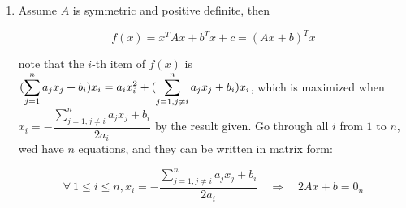 \documentclass[
]{article}
\begin{document}
\begin{enumerate}
\[  \begin{bmatrix}

  5&3&1\\3&3&1\\1&1&1

  \end{bmatrix}

  \begin{bmatrix}

  12\\10\\0

  \end{bmatrix}=\begin{bmatrix}

  \dfrac{45}{2}\\\dfrac{33}{2}\\\dfrac{11}{2}

  \end{bmatrix}\]

  which is the unique critical point. Then we check the 2nd order
  condition, since \(A\) is symmetric, and

  \[|A-\lambda I_3|=\begin{vmatrix}-1-\lambda&1&0\\1&-2-\lambda&1\\0&1&-3-\lambda\end{vmatrix}=-(\lambda+2)(\lambda^2+4\lambda+1)=0\]

  \(A\)\textquotesingle s eigenvalues are
  \(\lambda_1=-2<0,\lambda_2=-2-\sqrt{3}<0,\lambda_3=-2+\sqrt{3}<0\), we
  know that \(A\) is negative definite. Therefore, \(x^*\) is a global
  maximum point of \(f\),

  \[\max_xf(x)=f(x^*)=f(\dfrac{45}{2},\dfrac{33}{2},\dfrac{11}{2})=\dfrac{635}{2}\]
\item
  Assume \(A\) is symmetric and positive definite, then

  \[f(x)=x^TAx+b^Tx+c=(Ax+b)^Tx\]

  note that the \(i\)-th item of \(f(x)\) is
  \(\displaystyle(\sum_{j=1}^na_jx_j+b_i)x_i=a_ix_i^2+(\sum_{j=1,\\j\neq i}^na_jx_j+b_i)x_i\),
  which is maximized when
  \(x_i=-\dfrac{\displaystyle \sum_{j=1,j\neq i}^na_jx_j+b_i}{2a_i}\) by
  the result given. Go through all \(i\) from \(1\) to \(n\),
  we\textquotesingle d have \(n\) equations, and they can be written in
  matrix form:

  \[\forall\ 1\leqslant i\leqslant n,x_i=-\dfrac{\displaystyle \sum_{j=1,j\neq i}^na_jx_j+b_i}{2a_i}\quad\Rightarrow\quad 2Ax+b=0_n\]


\end{enumerate}
\end{document}
